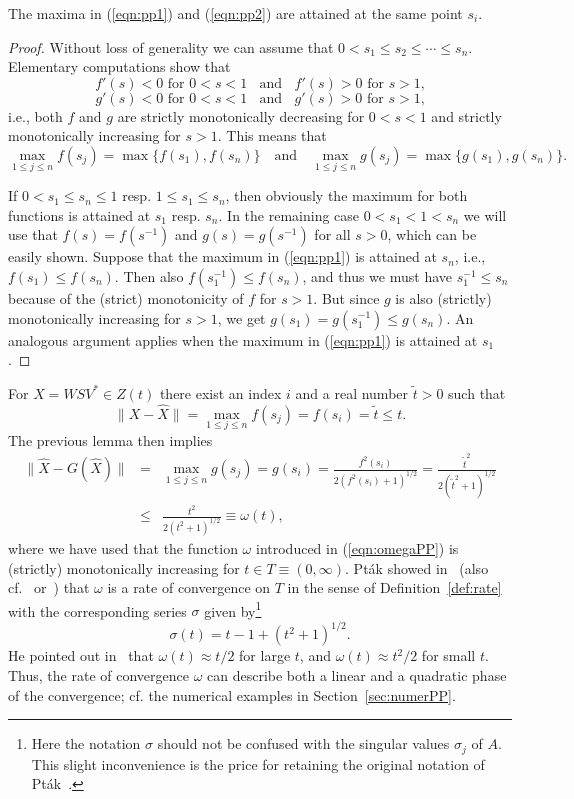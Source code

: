 \documentclass{siamltex}
\begin{document}
\medskip
\begin{lemma}
The maxima in (\ref{eqn:pp1}) and (\ref{eqn:pp2}) are attained at the same point $s_i$.
\end{lemma}

\medskip
\begin{proof}
Without loss of generality we can assume that $0<s_1\leq s_2\leq\cdots\leq s_n$.
Elementary computations show that
$$\mbox{$f'(s)<0$ for $0<s<1\;\;$ and $\;\;f'(s)>0$ for $s>1$,}$$
$$\mbox{$g'(s)<0$ for $0<s<1\;\;$ and $\;\;g'(s)>0$ for $s>1$,}$$
i.e., both $f$ and $g$ are strictly monotonically decreasing for $0<s<1$ and
strictly monotonically increasing for $s>1$. This means that
$$\max_{1\leq j\leq n} f(s_j)=\max\{f(s_1),f(s_n)\}\quad \mbox{and}\quad
\max_{1\leq j\leq n} g(s_j)=\max\{g(s_1),g(s_n)\}.$$

If $0<s_1\leq s_n\leq 1$ resp. $1\leq s_1\leq s_n$, then obviously the maximum for both
functions is attained at $s_1$ resp. $s_n$.
In the remaining case $0<s_1<1<s_n$ we will use
that $f(s)=f(s^{-1})$ and $g(s)=g(s^{-1})$ for all $s>0$, which can be easily shown.
Suppose that the maximum in (\ref{eqn:pp1}) is attained at $s_n$, i.e., $f(s_1)\leq f(s_n)$.
Then also $f(s_1^{-1})\leq f(s_n)$, and thus we must have $s_1^{-1}\leq s_n$ because of the
(strict) monotonicity of $f$ for $s>1$. But since $g$ is also (strictly) monotonically
increasing for $s>1$, we get $g(s_1)=g(s_1^{-1})\leq g(s_n)$. An analogous argument
applies when the maximum in (\ref{eqn:pp1}) is attained at $s_1$.
\end{proof}

\medskip
For $X=WSV^*\in Z(t)$ there exist an index $i$
and a real number $\widetilde{t}>0$ such that
$$\|X-\widehat{X}\| = \max_{1\leq j\leq n} f(s_j) = f(s_i) = \widetilde{t} \leq t.$$
The previous lemma then implies
\begin{eqnarray}
\|\widehat{X}-G(\widehat{X})\| &=& \max_{1\leq j\leq n} g(s_j) = g(s_i) =
\frac{f^2(s_i)}{2(f^2(s_i)+1)^{1/2}}=
\frac{\widetilde{t}^2}{2(\widetilde{t}^2+1)^{1/2}}\label{eqn:exact2}\\
&\leq &\frac{t^2}{2(t^2+1)^{1/2}}\equiv \omega(t),\label{eqn:omegaPP}
\end{eqnarray}
where we have used that the function $\omega$ introduced in (\ref{eqn:omegaPP}) is (strictly)
monotonically increasing for $t\in T\equiv (0,\infty)$.
Pt\'ak showed in~\cite{Pta76a} (also cf.~\cite{PotPta80,Pta77}
or~\cite[Example~1.4]{PotPtaBook84})
that $\omega$ is a rate of convergence on $T$ in the sense of Definition~\ref{def:rate}
with the corresponding series $\sigma$ given by\footnote{Here the notation $\sigma$ should
not be confused with the singular values $\sigma_j$ of $A$. This slight inconvenience
is the price for retaining the original notation of Pt\'ak~\cite{Pta76a,Pta76b,Pta77}.}
\begin{equation}\label{eqn:sigmaPP}
\sigma(t)=t-1+(t^2+1)^{1/2}.
\end{equation}
He pointed out in~\cite{Pta77} that $\omega(t)\approx t/2$ for large $t$, and $\omega(t)\approx t^2/2$
for small $t$. Thus, the rate of convergence $\omega$ can describe both a linear and a quadratic
phase of the convergence; cf. the numerical examples in Section~\ref{sec:numerPP}.
\end{document}
